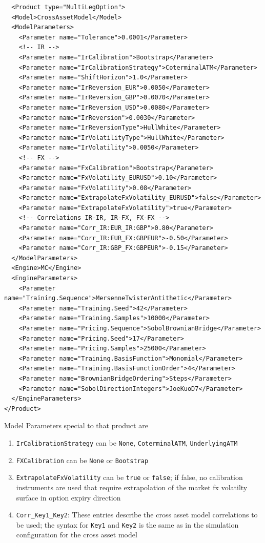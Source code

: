 \begin{verbatim}
  <Product type="MultiLegOption">
  <Model>CrossAssetModel</Model>
  <ModelParameters>
    <Parameter name="Tolerance">0.0001</Parameter>
    <!-- IR -->
    <Parameter name="IrCalibration">Bootstrap</Parameter>
    <Parameter name="IrCalibrationStrategy">CoterminalATM</Parameter>
    <Parameter name="ShiftHorizon">1.0</Parameter>
    <Parameter name="IrReversion_EUR">0.0050</Parameter>
    <Parameter name="IrReversion_GBP">0.0070</Parameter>
    <Parameter name="IrReversion_USD">0.0080</Parameter>
    <Parameter name="IrReversion">0.0030</Parameter>
    <Parameter name="IrReversionType">HullWhite</Parameter>
    <Parameter name="IrVolatilityType">HullWhite</Parameter>
    <Parameter name="IrVolatility">0.0050</Parameter>
    <!-- FX -->
    <Parameter name="FxCalibration">Bootstrap</Parameter>
    <Parameter name="FxVolatility_EURUSD">0.10</Parameter>
    <Parameter name="FxVolatility">0.08</Parameter>
    <Parameter name="ExtrapolateFxVolatility_EURUSD">false</Parameter>
    <Parameter name="ExtrapolateFxVolatility">true</Parameter>
    <!-- Correlations IR-IR, IR-FX, FX-FX -->
    <Parameter name="Corr_IR:EUR_IR:GBP">0.80</Parameter>
    <Parameter name="Corr_IR:EUR_FX:GBPEUR">-0.50</Parameter>
    <Parameter name="Corr_IR:GBP_FX:GBPEUR">-0.15</Parameter>
  </ModelParameters>
  <Engine>MC</Engine>
  <EngineParameters>
    <Parameter name="Training.Sequence">MersenneTwisterAntithetic</Parameter>
    <Parameter name="Training.Seed">42</Parameter>
    <Parameter name="Training.Samples">10000</Parameter>
    <Parameter name="Pricing.Sequence">SobolBrownianBridge</Parameter>
    <Parameter name="Pricing.Seed">17</Parameter>
    <Parameter name="Pricing.Samples">25000</Parameter>
    <Parameter name="Training.BasisFunction">Monomial</Parameter>
    <Parameter name="Training.BasisFunctionOrder">4</Parameter>
    <Parameter name="BrownianBridgeOrdering">Steps</Parameter>
    <Parameter name="SobolDirectionIntegers">JoeKuoD7</Parameter>
  </EngineParameters>
</Product>
\end{verbatim}

Model Parameters special to that product are

\begin{enumerate}
\item \verb+IrCalibrationStrategy+ can be \verb+None+, \verb+CoterminalATM+, \verb+UnderlyingATM+
\item \verb+FXCalibration+ can be \verb+None+ or \verb+Bootstrap+
\item \verb+ExtrapolateFxVolatility+ can be \verb+true+ or \verb+false+; if false, no calibration instruments are used
  that require extrapolation of the market fx volatilty surface in option expiry direction
\item \verb+Corr_Key1_Key2+: These entries describe the cross asset model correlations to be used; the syntax for
  \verb+Key1+ and \verb+Key2+ is the same as in the simulation configuration for the cross asset model
\end{enumerate}


